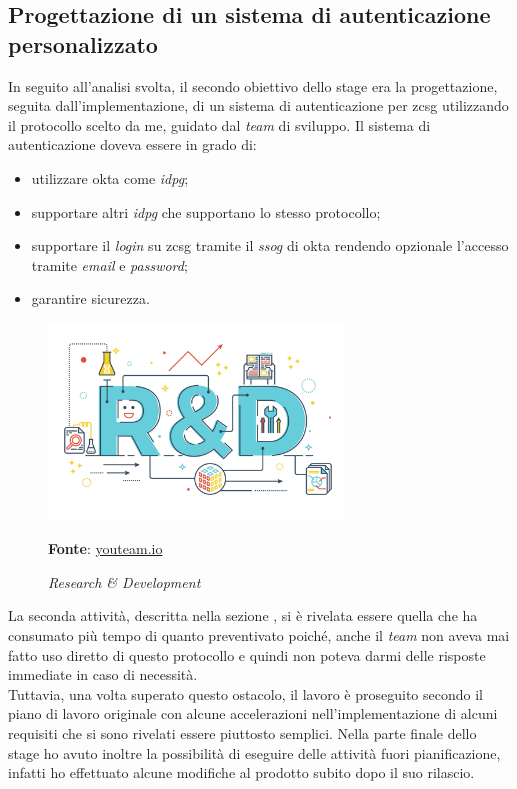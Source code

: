     \subsection{Progettazione di un sistema di autenticazione personalizzato} \label{sec:att_progett}
        In seguito all'analisi svolta, il secondo obiettivo dello stage era la progettazione, seguita dall'implementazione, di un sistema di autenticazione per \gls{zcsg} utilizzando il protocollo scelto da me, guidato dal \textit{team} di sviluppo. Il sistema di autenticazione doveva essere in grado di:
        \begin{itemize}
            \setlength\itemsep{0em}
            \item utilizzare \gls{okta} come \textit{\gls{idpg}};
            \item supportare altri \textit{\gls{idpg}} che supportano lo stesso protocollo;
            \item supportare il \textit{login} su \gls{zcsg} tramite il \textit{\gls{ssog}} di \gls{okta} rendendo opzionale l'accesso tramite \textit{email} e \textit{password};
            \item garantire sicurezza.
        \end{itemize}
    \begin{figure}[ht]
        \centering
        \includegraphics[width=0.7\textwidth]{immagini/rd.jpg}
        \caption{\textit{Research \& Development}}
        \textbf{Fonte}:
        \href{https://youteam.io/blog/research-and-development-the-fourth-pillar-of-software-development/}{youteam.io}
        \label{fig: Research & Development}
    \end{figure}

\newpage

La seconda attività, descritta nella sezione , si è rivelata essere quella che ha consumato più tempo di quanto preventivato poiché, anche il \textit{team} non aveva mai fatto uso diretto di questo protocollo e quindi non poteva darmi delle risposte immediate in caso di necessità.\\
Tuttavia, una volta superato questo ostacolo, il lavoro è proseguito secondo il piano di lavoro originale con alcune accelerazioni nell'implementazione di alcuni requisiti che si sono rivelati essere piuttosto semplici. Nella parte finale dello stage ho avuto inoltre la possibilità di eseguire delle attività fuori pianificazione, infatti ho effettuato alcune modifiche al prodotto subito dopo il suo rilascio.


